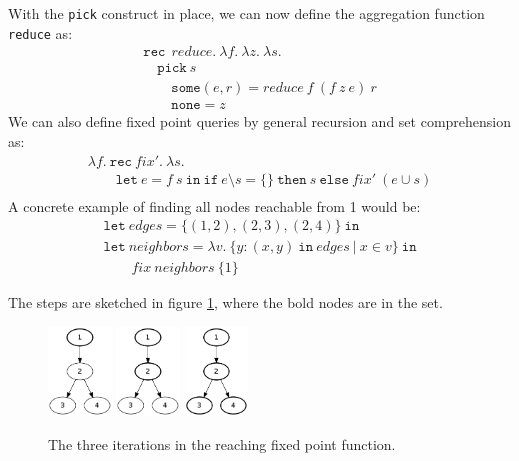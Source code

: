 \documentclass[a4paper]{article}
\newcommand{\code}[1]{{\tt #1}}
\newcommand{\pipe}{\ | \ }
\newcommand{\s}[1]{\mathtt{#1}}
\newcommand{\sLb}{\s{\{}}
\newcommand{\sRb}{\s{\}}}
\newcommand{\sif}{\s{if\ }}
\newcommand{\sthen}{\s{\ then\ }}
\newcommand{\selse}{\s{\ else\ }}
\newcommand{\sletin}[2]{\s{let\ } #1 \s{\ in\ } #2}
\newcommand{\srec}{\s{rec\ }}
\begin{document}
With the \code{pick} construct in place, we can now define the aggregation function \code{reduce} as:
\[\begin{array}{l}
\srec \  reduce.\ \lambda f.\ \lambda z.\ \lambda s.\\
\quad \s{pick} \ s \\
\quad\quad \s{some} (e,r) = reduce \ f \ (f \  z \  e)\ r\\
\quad\quad \s{none} = z
\end{array}\]
We can also define fixed point queries by general recursion and set comprehension as:
\[\begin{array}{l}
\lambda f.\ \srec fix'.\ \lambda s.\\
\quad\quad\sletin{e = f\ s}{\sif e \setminus s = \{\} \sthen s \selse fix'\ (e \cup s)} \\
\end{array}\]
A concrete example of finding all nodes reachable from 1 would be:
\[\begin{array}{l}
\s{let\ } edges = \{(1, 2), (2, 3), (2, 4)\} \s{\ in}\\
\s{let\ } neighbors = \lambda v.\ \sLb y : (x,y) \s{\ in\ } edges \pipe x\in v \sRb\ \s{in} \\
\quad\quad fix\ neighbors\  \{1\}
\end{array}\]

The steps are sketched in figure \ref{figure:graph},
where the bold nodes are in the set.

\begin{figure}[h]
\centering
\includegraphics[width=0.15\textwidth]{grapha.png}
\includegraphics[width=0.15\textwidth]{graphb.png}
\includegraphics[width=0.15\textwidth]{graphc.png}
\caption{The three iterations in the reaching fixed point function.}
\label{figure:graph}
\end{figure}
\end{document}
